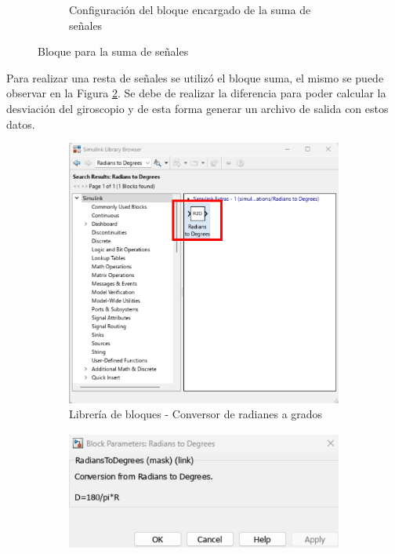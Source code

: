\begin{figure}[htbp]
\begin{subfigure}[b]{0.45\textwidth}
        \caption{Configuración del bloque encargado de la suma de señales}
        \label{fig:config_add_IMU}
    \end{subfigure}
    \caption{Bloque para la suma de señales}
    \label{fig:add_of_some_signals}
\end{figure}

Para realizar una resta de señales se utilizó el bloque suma, el mismo se puede observar en la Figura \ref{fig:add_of_some_signals}. Se debe de realizar la diferencia para poder calcular la desviación del giroscopio y de esta forma generar un archivo de salida con estos datos. 


\begin{figure}[htbp]
    \centering
    \begin{subfigure}[b]{0.35\textwidth}
        \centering
        \includegraphics[width=\textwidth]{fig/Capitulo5/Caso_de_estudio_IMU/Generador_de_salidas/libreria_bloque__rad_2_deg.pdf}
        \caption{Librería de bloques - Conversor de radianes a grados}
        \label{fig:lib_bloques_R2D}
    \end{subfigure}
    \hfill
    \begin{subfigure}[b]{0.45\textwidth}
        \centering
        \includegraphics[width=\textwidth]{fig/Capitulo5/Caso_de_estudio_IMU//Generador_de_salidas/configuracion_rad_2_deg.pdf}

\end{subfigure}
\end{figure}
